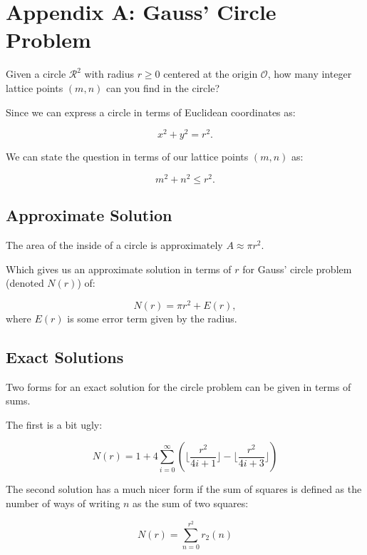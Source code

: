 \section{Appendix A: Gauss' Circle Problem}

\begin{que}
Given a circle $\mathcal{R}^{2}$ with radius $r \geq 0$ centered at the origin $\mathcal{O}$, how many integer lattice points $(m,n)$ can you find in the circle?
\end{que}

Since we can express a circle in terms of Euclidean coordinates as:

\[x^{2} + y^{2} = r^{2}.\]

We can state the question in terms of our lattice points $(m,n)$ as:

\[m^{2} + n^{2} \leq r^{2}.\]

\subsection*{Approximate Solution}

The area of the inside of a circle is approximately $A \approx \pi r^{2}$.

Which gives us an approximate solution in terms of $r$ for Gauss' circle problem (denoted $N(r)$) of:

\[N(r) = \pi r^{2} + E(r),\]
where $E(r)$ is some error term given by the radius.


\subsection*{Exact Solutions}

Two forms for an exact solution for the circle problem can be given in terms of sums. 

The first is a bit ugly:
\begin{sol}
    \[N(r) = 1 + 4 \sum_{i=0}^{\infty} \left( \bigg \lfloor \frac{r^{2}}{4i+1} \bigg \rfloor - \bigg \lfloor \frac{r^{2}}{4i+3} \bigg \rfloor \right)\]
\end{sol}

The second solution has a much nicer form if the sum of squares is defined as the number of ways of writing $n$ as the sum of two squares:

\begin{sol}
\[N(r) = \sum_{n=0}^{r^{2}} r_{2}(n)\]
\end{sol}


